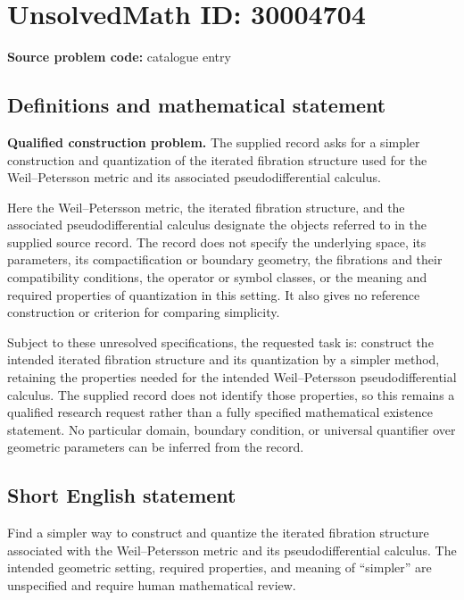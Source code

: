 \documentclass[11pt]{article}
\begin{document}
\section*{UnsolvedMath ID: 30004704}
\textbf{Source problem code:} catalogue entry
\subsection{Definitions and mathematical statement}
\textbf{Qualified construction problem.} The supplied record asks for a simpler construction and quantization of the iterated fibration structure used for the Weil--Petersson metric and its associated pseudodifferential calculus.

Here the Weil--Petersson metric, the iterated fibration structure, and the associated pseudodifferential calculus designate the objects referred to in the supplied source record. The record does not specify the underlying space, its parameters, its compactification or boundary geometry, the fibrations and their compatibility conditions, the operator or symbol classes, or the meaning and required properties of quantization in this setting. It also gives no reference construction or criterion for comparing simplicity.

Subject to these unresolved specifications, the requested task is: construct the intended iterated fibration structure and its quantization by a simpler method, retaining the properties needed for the intended Weil--Petersson pseudodifferential calculus. The supplied record does not identify those properties, so this remains a qualified research request rather than a fully specified mathematical existence statement. No particular domain, boundary condition, or universal quantifier over geometric parameters can be inferred from the record.
\subsection{Short English statement}
Find a simpler way to construct and quantize the iterated fibration structure associated with the Weil--Petersson metric and its pseudodifferential calculus. The intended geometric setting, required properties, and meaning of ``simpler'' are unspecified and require human mathematical review.
\end{document}
